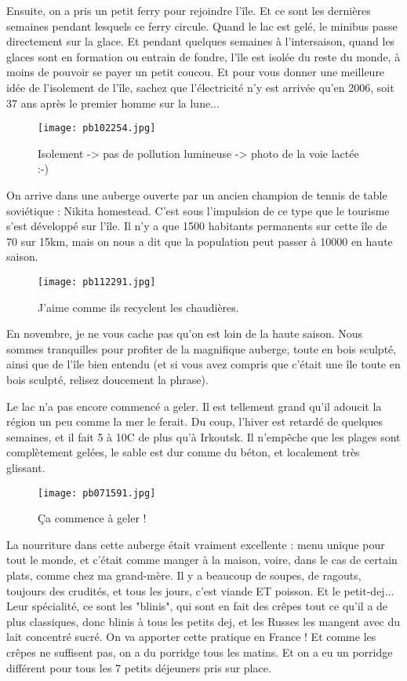 \documentclass{book}
\begin{document}
Ensuite, on a pris un petit ferry pour rejoindre l'île. Et ce sont les dernières semaines pendant lesquels ce ferry circule. Quand le lac est gelé, le minibus passe directement sur la glace. Et pendant quelques semaines à l'intersaison, quand les glaces sont en formation ou entrain de fondre, l'île est isolée du reste du monde, à moins de pouvoir se payer un petit coucou. Et pour vous donner une meilleure idée de l'isolement de l'île, sachez que l'électricité n'y est arrivée qu'en 2006, soit 37 ans après le premier homme sur la lune...


\begin{figure}[h]
\centering
\texttt{[image: pb102254.jpg]}
\caption*{ Isolement -> pas de pollution lumineuse -> photo de la voie lactée :-)}
\end{figure}

On arrive dans une auberge ouverte par un ancien champion de tennis de table soviétique : Nikita homestead. C'est sous l'impulsion de ce type que le tourisme s'est développé sur l'île. Il n'y a que 1500 habitants permanents sur cette île de 70 sur 15km, mais on nous a dit que la population peut passer à 10000 en haute saison.


\begin{figure}[h]
\centering
\texttt{[image: pb112291.jpg]}
\caption*{ J'aime comme ils recyclent les chaudières.}
\end{figure}

En novembre, je ne vous cache pas qu'on est loin de la haute saison. Nous sommes tranquilles pour profiter de la magnifique auberge, toute en bois sculpté, ainsi que de l'île bien entendu (et si vous avez compris que c'était une île toute en bois sculpté, relisez doucement la phrase).

Le lac n'a pas encore commencé a geler. Il est tellement grand qu'il adoucit la région un peu comme la mer le ferait. Du coup, l'hiver est retardé de quelques semaines, et il fait 5 à 10\textdegree C de plus qu'à Irkoutsk. Il n'empêche que les plages sont complètement gelées, le sable est dur comme du béton, et localement très glissant.


\begin{figure}[h]
\centering
\texttt{[image: pb071591.jpg]}
\caption*{ Ça commence à geler !}
\end{figure}

La nourriture dans cette auberge était vraiment excellente : menu unique pour tout le monde, et c'était comme manger à la maison, voire, dans le cas de certain plats, comme chez ma grand-mère. Il y a beaucoup de soupes, de ragouts, toujours des crudités, et tous les jours, c'est viande ET poisson. Et le petit-dej... Leur spécialité, ce sont les "blinis", qui sont en fait des crêpes tout ce qu'il a de plus classiques, donc blinis à tous les petits dej, et les Russes les mangent avec du lait concentré sucré. On va apporter cette pratique en France ! Et comme les crêpes ne suffisent pas, on a du porridge tous les matins. Et on a eu un porridge différent pour tous les 7 petits déjeuners pris sur place.
\end{document}
